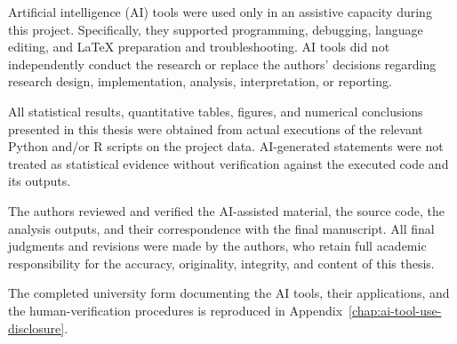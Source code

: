 
\label{chap:ai-tool-use}

Artificial intelligence (AI) tools were used only in an assistive capacity during this project. Specifically, they supported programming, debugging, language editing, and LaTeX preparation and troubleshooting. AI tools did not independently conduct the research or replace the authors’ decisions regarding research design, implementation, analysis, interpretation, or reporting.

All statistical results, quantitative tables, figures, and numerical conclusions presented in this thesis were obtained from actual executions of the relevant Python and/or R scripts on the project data. AI-generated statements were not treated as statistical evidence without verification against the executed code and its outputs.

The authors reviewed and verified the AI-assisted material, the source code, the analysis outputs, and their correspondence with the final manuscript. All final judgments and revisions were made by the authors, who retain full academic responsibility for the accuracy, originality, integrity, and content of this thesis.

The completed university form documenting the AI tools, their applications, and the human-verification procedures is reproduced in Appendix~\ref{chap:ai-tool-use-disclosure}.
